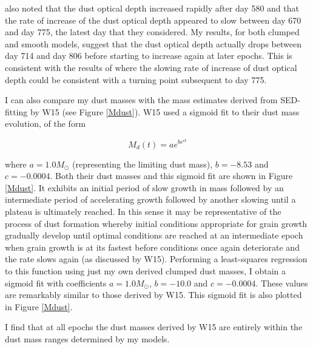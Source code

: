 \citet{Lucy1989} also noted that the dust optical depth increased rapidly 
after day 580 and that the rate of increase of the dust optical depth 
appeared to slow between day 670 and day 775, the latest day that they 
considered.  My results, for both clumped and smooth models, suggest that 
the dust optical depth actually drops between day 714 and day 806 before 
starting to increase again at later epochs.  This is consistent with the 
results of \citet{Lucy1989} where the slowing rate of increase of dust 
optical depth could be consistent with a turning point subsequent to day 
775.

I can also compare my dust masses with the mass estimates derived from 
SED-fitting by W15 (see Figure \ref{Mdust}).  W15 used a sigmoid fit to 
their dust mass evolution, of the form

\begin{equation}
M_d(t)=ae^{be^{ct}}
\end{equation}
 
\noindent where $a=1.0M_{\odot}$ (representing the limiting dust mass), 
$b=-8.53$ and $c=-0.0004$.  Both their dust masses and this sigmoid fit 
are shown in Figure \ref{Mdust}.  It exhibits an initial period of slow 
growth in mass followed by an intermediate period of accelerating growth 
followed by another slowing until a plateau is ultimately reached.  In 
this sense it may be representative of the process of dust 
formation whereby initial conditions appropriate for grain growth 
gradually develop until optimal conditions are reached at an intermediate 
epoch when grain growth is at its fastest before conditions once again 
deteriorate and the rate slows again (as discussed by W15).  Performing a 
least-squares regression to this function using just my own derived 
clumped dust masses, I obtain a sigmoid fit with coefficients 
$a=1.0M_{\odot}$, $b=-10.0$ and $c=-0.0004$.  These values are 
remarkably similar to those derived by W15.  This sigmoid fit is also 
plotted in Figure \ref{Mdust}.

I find that at all epochs the dust masses derived by W15 are entirely 
within the dust mass ranges determined by my models.

